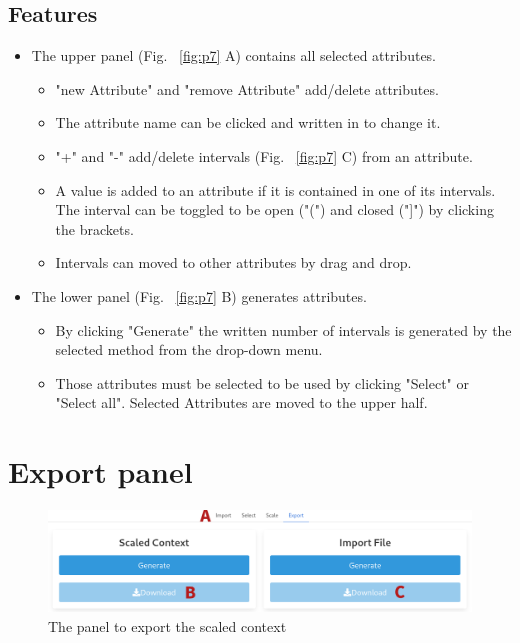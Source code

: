 \documentclass[]{article}
\begin{document}
\subsection{Features}
\begin{itemize}
    \item The upper panel (Fig. ~\ref{fig:p7} A) contains all selected attributes.
    \begin{itemize}
        \item "new Attribute" and "remove Attribute" add/delete attributes. 
        \item The attribute name can be clicked and written in to change it.
        \item "+" and "-" add/delete intervals (Fig. ~\ref{fig:p7} C) from an attribute.
        \item A value is added to an attribute if it is contained in one of its intervals. The interval can be toggled to be open ("(") and closed ("]") by clicking the brackets.
        \item Intervals can moved to other attributes by drag and drop.
    \end{itemize}
    \item The lower panel (Fig. ~\ref{fig:p7} B) generates attributes.
    \begin{itemize}
        \item By clicking "Generate" the written number of intervals is generated by the selected method from the drop-down menu.
        \item Those attributes must be selected to be used by clicking "Select" or "Select all". Selected Attributes are moved to the upper half.
    \end{itemize}
\end{itemize}

\section{Export panel}
\begin{figure}[H]
	\includegraphics[width=\linewidth]{images/export.png}
	\caption{The panel to export the scaled context}
	\label{fig:p8}
\end{figure}
\end{document}
